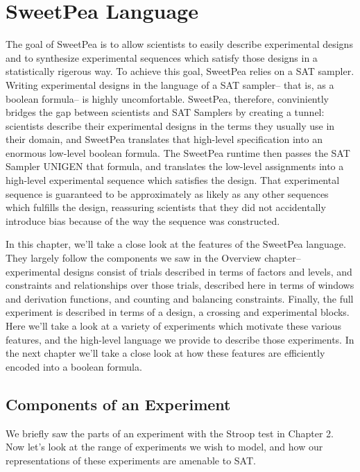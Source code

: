 
\chapter{SweetPea Language}

The goal of SweetPea is to allow scientists to easily describe experimental designs and to synthesize experimental sequences which satisfy those designs in a statistically rigerous way. To achieve this goal, SweetPea relies on a SAT sampler. Writing experimental designs in the language of a SAT sampler-- that is, as a boolean formula-- is highly uncomfortable. SweetPea, therefore, conviniently bridges the gap between scientists and SAT Samplers by creating a tunnel: scientists describe their experimental designs in the terms they usually use in their domain, and SweetPea translates that high-level specification into an enormous low-level boolean formula. The SweetPea runtime then passes the SAT Sampler UNIGEN that formula, and translates the low-level assignments into a high-level experimental sequence which satisfies the design. That experimental sequence is guaranteed to be approximately as likely as any other sequences which fulfills the design, reassuring scientists that they did not accidentally introduce bias because of the way the sequence was constructed.

In this chapter, we'll take a close look at the features of the SweetPea language. They largely follow the components we saw in the Overview chapter-- experimental designs consist of trials described in terms of factors and levels, and constraints and relationships over those trials, described here in terms of windows and derivation functions, and counting and balancing constraints. Finally, the full experiment is described in terms of a design, a crossing and experimental blocks. Here we'll take a look at a variety of experiments which motivate these various features, and the high-level language we provide to describe those experiments. In the next chapter we'll take a close look at how these features are efficiently encoded into a boolean formula.



\section{Components of an Experiment}

We briefly saw the parts of an experiment with the Stroop test in Chapter 2. Now let's look at the range of experiments we wish to model, and how our representations of these experiments are amenable to SAT.

